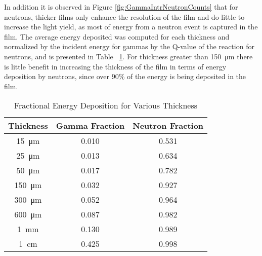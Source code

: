 In addition it is observed in Figure \ref{fig:GammaIntrNeutronCounts} that for neutrons, thicker films only enhance the resolution of the film and do little to increase the light yield, as most of energy from a neutron event is captured in the film.
The average energy deposited was computed for each thickness and normalized by the incident energy for gammas by the Q-value of the reaction for neutrons, and is presented in Table ~\ref{tab:FractionEDep}.
For thickness greater than \SI{150}{\um} there is little benefit in increasing the thickness of the film in terms of energy deposition by neutrons, since over 90\% of the energy is being deposited in the film.
\begin{table}[ht]
    \caption{Fractional Energy Deposition for Various Thickness}
	\centering
	\begin{tabular}{c | c c}
	Thickness & Gamma Fraction & Neutron Fraction \\
	\hline
	\hline
	\SI{15}{\um} & 0.010 & 0.531 \\
	\SI{25}{\um} & 0.013 & 0.634 \\
	\SI{50}{\um} & 0.017 & 0.782 \\
	\SI{150}{\um} & 0.032 & 0.927 \\
	\SI{300}{\um} & 0.052 & 0.964 \\
	\SI{600}{\um} & 0.087 & 0.982 \\
	\SI{1}{\mm} & 0.130 & 0.989 \\
	\SI{1}{\cm} & 0.425 & 0.998 \\
	\end{tabular}
  \label{tab:FractionEDep}
\end{table}

